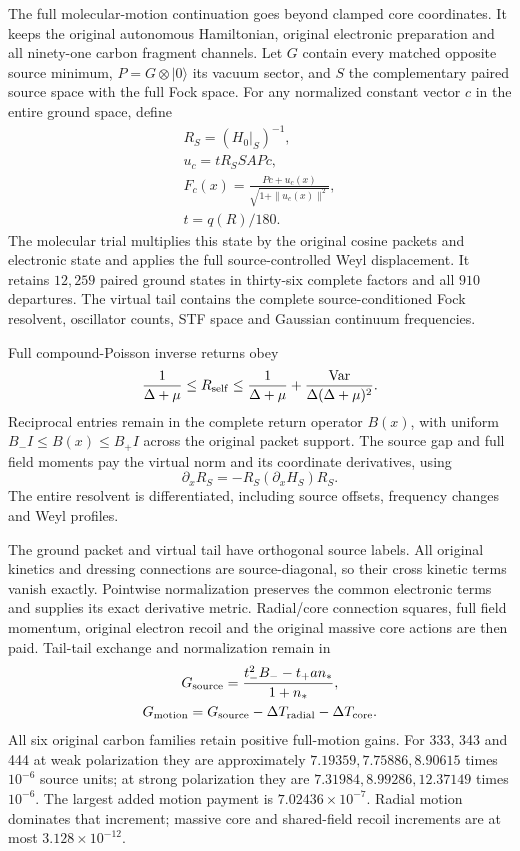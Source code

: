 The full molecular-motion continuation goes beyond clamped core coordinates. It keeps the original autonomous Hamiltonian, original electronic preparation and all ninety-one carbon fragment channels. Let $G$ contain every matched opposite source minimum, $P=G\otimes|0\rangle$ its vacuum sector, and $S$ the complementary paired source space with the full Fock space. For any normalized constant vector $c$ in the entire ground space, define
\[
\begin{gathered}
R_S=(H_0|_S)^{-1},\\
 u_c=tR_SSA Pc,\\
 F_c(x)=\frac{Pc+u_c(x)}{\sqrt{1+\|u_c(x)\|^2}},\\
 t=q(R)/180.
\end{gathered}
\]
The molecular trial multiplies this state by the original cosine packets and electronic state and applies the full source-controlled Weyl displacement. It retains $12{,}259$ paired ground states in thirty-six complete factors and all $910$ departures. The virtual tail contains the complete source-conditioned Fock resolvent, oscillator counts, STF space and Gaussian continuum frequencies. 

Full compound-Poisson inverse returns obey
\[
 \frac1{\Delta+\mu}\leq R_{\rm self}
 \leq\frac1{\Delta+\mu}
       +\frac{\operatorname{Var}}{\Delta(\Delta+\mu)^2}.
\]
Reciprocal entries remain in the complete return operator $B(x)$, with uniform $B_-I\leq B(x)\leq B_+I$ across the original packet support. The source gap and full field moments pay the virtual norm and its coordinate derivatives, using
\[
 \partial_xR_S=-R_S(\partial_xH_S)R_S.
\]
The entire resolvent is differentiated, including source offsets, frequency changes and Weyl profiles.

The ground packet and virtual tail have orthogonal source labels. All original kinetics and dressing connections are source-diagonal, so their cross kinetic terms vanish exactly. Pointwise normalization preserves the common electronic terms and supplies its exact derivative metric. Radial/core connection squares, full field momentum, original electron recoil and the original massive core actions are then paid. Tail-tail exchange and normalization remain in
\[
\begin{gathered}
G_{\rm source}=\frac{t_-^2B_--t_+a n_*}{1+n_*},
 \\
 G_{\rm motion}=G_{\rm source}-\Delta T_{\rm radial}-\Delta T_{\rm core}.
\end{gathered}
\]
All six original carbon families retain positive full-motion gains. For 333, 343 and 444 at weak polarization they are approximately $7.19359,7.75886,8.90615$ times $10^{-6}$ source units; at strong polarization they are $7.31984,8.99286,12.37149$ times $10^{-6}$. The largest added motion payment is $7.02436\times10^{-7}$. Radial motion dominates that increment; massive core and shared-field recoil increments are at most $3.128\times10^{-12}$.

